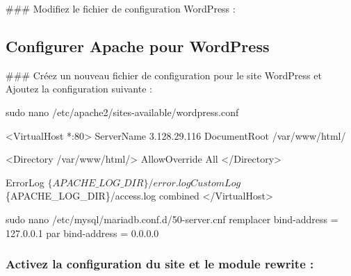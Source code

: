 \#\#\# Modifiez le fichier de configuration Word\+Press \+: 


\subsection*{Configurer Apache pour Word\+Press}

\#\#\# Créez un nouveau fichier de configuration pour le site Word\+Press et Ajoutez la configuration suivante \+: 
\begin{DoxyCode}
sudo nano /etc/apache2/sites-available/wordpress.conf

<VirtualHost *:80>
    ServerName 3.128.29.116
    DocumentRoot /var/www/html/

    <Directory /var/www/html/>
        AllowOverride All
    </Directory>

    ErrorLog $\{APACHE\_LOG\_DIR\}/error.log
    CustomLog $\{APACHE\_LOG\_DIR\}/access.log combined
</VirtualHost>
\end{DoxyCode}



\begin{DoxyCode}
sudo nano /etc/mysql/mariadb.conf.d/50-server.cnf
remplacer
bind-address            = 127.0.0.1
par
bind-address            = 0.0.0.0
\end{DoxyCode}


\subsubsection*{Activez la configuration du site et le module rewrite \+:}


